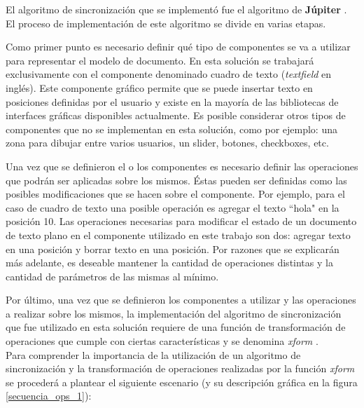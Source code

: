 \documentclass[12pt,a4paper]{article}
\begin{document}
	El algoritmo de sincronización que se implementó fue el algoritmo de \textbf{Júpiter} \cite{jupiter}. 
	El proceso de implementación de este algoritmo se divide en varias etapas.
	
	Como primer punto es necesario definir qué tipo de componentes se va a utilizar para representar el modelo
	de documento. En esta solución se trabajará exclusivamente con el componente denominado cuadro de texto
	(\textit{textfield} en inglés). Este componente gráfico permite que se puede insertar texto en 
	posiciones definidas por el usuario y existe en la mayoría de las bibliotecas de interfaces gráficas 
	disponibles actualmente. Es posible considerar otros tipos de componentes que no se implementan en esta
	solución, como por ejemplo: una zona para dibujar entre varios usuarios, un slider, botones, checkboxes, etc.
	
	Una vez que se definieron el o los componentes es necesario definir las operaciones que podrán ser aplicadas sobre
	los mismos. Éstas pueden ser definidas como las posibles modificaciones que se hacen sobre el componente.
	Por ejemplo, para el caso de cuadro de texto una posible operación es agregar el texto \textsf{``hola"} 
	en la posición 10.
	Las operaciones necesarias para modificar el estado de un documento de texto plano en el componente utilizado
	en este trabajo son	dos: agregar texto en una posición y borrar texto en una posición.
	Por razones que se explicarán más adelante, es deseable mantener la cantidad de operaciones distintas y
	la cantidad de parámetros de las mismas al mínimo.

	Por último, una vez que se definieron los componentes a utilizar y las operaciones a realizar sobre los mismos,
	la implementación del algoritmo de sincronización que fue utilizado en esta solución requiere de una función 
	de transformación de operaciones que cumple con ciertas características y se denomina
	\textit{xform } \cite{jupiter}. \\

	Para comprender la importancia de la utilización de un algoritmo de sincronización y la transformación
	de operaciones realizadas por la función \textit{xform }se procederá a plantear el siguiente escenario
	(y su descripción gráfica en la figura \ref{secuencia_ops_1}):
	
\end{document}
